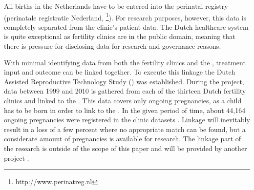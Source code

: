 All births in the Netherlands have to be entered into the perinatal registry (perinatale registratie Nederland, \PRN{}\footnote{http://www.perinatreg.nl}).
For research purposes, however, this data is completely separated from the clinic's patient data.
The Dutch healthcare system is quite exceptional as fertility clinics are in the public domain, 
meaning that there is pressure for disclosing  data for research and governance reasons.

With minimal identifying data from both the fertility clinics and the \PRN{}, treatment input and outcome can be linked together.
To execute this linkage the Dutch Assisted Reproductive Technology Study (\project{}) was established.
During the project, data between 1999 and 2010 is gathered from each of the thirteen Dutch fertility clinics and linked to the \PRN{}.
This data covers only ongoing pregnancies, as a child has to be born in order to link to the \PRN{}.
In the given period of time, about 44,164 ongoing pregnancies were registered in the clinic datasets \cite{ivfReportNVOG}.
Linkage will inevitably result in a loss of a few percent where no appropriate match can be found, 
but a considerate amount of pregnancies is available for research.
The linkage part of the research is outside of the scope of this paper and will be provided by another project \cite{}.

